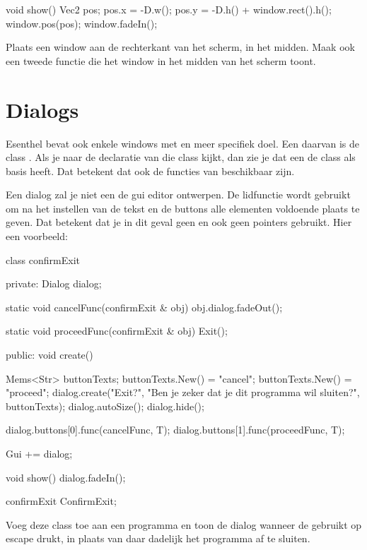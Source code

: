 \begin{code}
void show() {
   Vec2 pos;
	 pos.x = -D.w();
	 pos.y = -D.h() + window.rect().h();
   window.pos(pos);
	 window.fadeIn();
}
\end{code}

\begin{exercise}
Plaats een window aan de rechterkant van het scherm, in het midden. Maak ook een tweede functie  die het window in het midden van het scherm toont.
\end{exercise}

\section{Dialogs}
Esenthel bevat ook enkele windows met en meer specifiek doel. Een daarvan is de class . Als je naar de declaratie van die class kijkt, dan zie je dat een  de class  als basis heeft. Dat betekent dat ook de functies van  beschikbaar zijn.

Een dialog zal je niet een de gui editor ontwerpen. De lidfunctie  wordt gebruikt om na het instellen van de tekst en de buttons alle elementen voldoende plaats te geven. Dat betekent dat je in dit geval geen  en ook geen pointers gebruikt. Hier een voorbeeld:

\begin{code}
class confirmExit {
private:
   Dialog dialog;
   
   static void cancelFunc(confirmExit & obj)
   {
      obj.dialog.fadeOut();
   }
   
   static void proceedFunc(confirmExit & obj)
   {
      Exit();
   }
      
public:
   void create() {
      Mems<Str> buttonTexts;
      buttonTexts.New() = "cancel";
      buttonTexts.New() = "proceed";
      dialog.create("Exit?", "Ben je zeker dat je dit programma wil sluiten?", buttonTexts);
      dialog.autoSize();
      dialog.hide();
      
      dialog.buttons[0].func(cancelFunc, T);
      dialog.buttons[1].func(proceedFunc, T);
      
      Gui += dialog;
   }
   
   void show() {
      dialog.fadeIn();
   }
}

confirmExit ConfirmExit;
\end{code}

\begin{exercise}
Voeg deze class toe aan een programma en toon de dialog wanneer de gebruikt op escape drukt, in plaats van daar dadelijk het programma af te sluiten.
\end{exercise}

